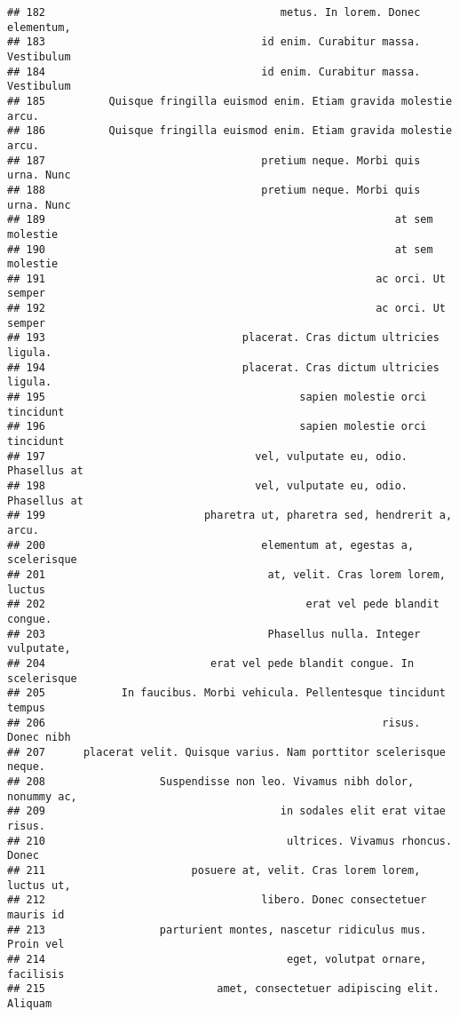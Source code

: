\documentclass[
]{article}
\begin{document}
\begin{verbatim}
## 182                                     metus. In lorem. Donec elementum,
## 183                                  id enim. Curabitur massa. Vestibulum
## 184                                  id enim. Curabitur massa. Vestibulum
## 185          Quisque fringilla euismod enim. Etiam gravida molestie arcu.
## 186          Quisque fringilla euismod enim. Etiam gravida molestie arcu.
## 187                                  pretium neque. Morbi quis urna. Nunc
## 188                                  pretium neque. Morbi quis urna. Nunc
## 189                                                       at sem molestie
## 190                                                       at sem molestie
## 191                                                    ac orci. Ut semper
## 192                                                    ac orci. Ut semper
## 193                               placerat. Cras dictum ultricies ligula.
## 194                               placerat. Cras dictum ultricies ligula.
## 195                                        sapien molestie orci tincidunt
## 196                                        sapien molestie orci tincidunt
## 197                                 vel, vulputate eu, odio. Phasellus at
## 198                                 vel, vulputate eu, odio. Phasellus at
## 199                         pharetra ut, pharetra sed, hendrerit a, arcu.
## 200                                  elementum at, egestas a, scelerisque
## 201                                   at, velit. Cras lorem lorem, luctus
## 202                                         erat vel pede blandit congue.
## 203                                   Phasellus nulla. Integer vulputate,
## 204                          erat vel pede blandit congue. In scelerisque
## 205            In faucibus. Morbi vehicula. Pellentesque tincidunt tempus
## 206                                                     risus. Donec nibh
## 207      placerat velit. Quisque varius. Nam porttitor scelerisque neque.
## 208                  Suspendisse non leo. Vivamus nibh dolor, nonummy ac,
## 209                                     in sodales elit erat vitae risus.
## 210                                      ultrices. Vivamus rhoncus. Donec
## 211                       posuere at, velit. Cras lorem lorem, luctus ut,
## 212                                  libero. Donec consectetuer mauris id
## 213                  parturient montes, nascetur ridiculus mus. Proin vel
## 214                                      eget, volutpat ornare, facilisis
## 215                           amet, consectetuer adipiscing elit. Aliquam

\end{verbatim}
\end{document}
